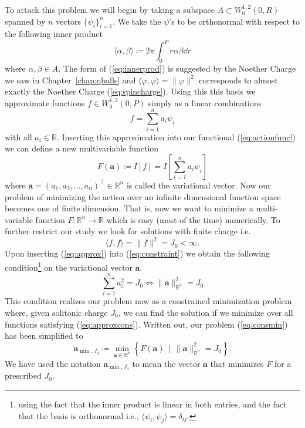 To attack this problem we will begin by taking a subspace
\(A\subset W^{1,2}_0(0,R)\) spanned by \(n\) vectors \(\{\psi_i\}_{i = 1}^n\).
We take the \(\psi\)'s to be orthonormal with respect to the following inner
product
\begin{equation}\label{eq:innerprod}
    \langle\alpha,\beta\rangle\coloneqq 2\pi\int_0^P r\alpha\beta\dd{r}
\end{equation}
where \(\alpha,\beta\in A\).
The form of (\ref{eq:innerprod}) is suggested by the Noether Charge we saw in
Chapter~\ref{chap:qballs} and \(\langle\varphi,\varphi\rangle = \|\varphi\|^2\)
corresponds to almost exactly the Noether Charge (\ref{eq:spincharge}). Using
this this basis we approximate functions \(f \in W_0^{1,2}(0, P)\) simply as a
linear combinations
\begin{equation}\label{eq:approx}
    f = \sum_{i = 1}^n a_i\psi_i
\end{equation}
with all \(a_i\in \mathbb{R}\). Inserting this approximation into our functional
(\ref{eq:actionfunc}) we can define a new multivariable function
\begin{equation}\label{eq:objfun}
    F(\mathbf{a}) \coloneqq I[f] = I\!\left[\sum_{i = 1}^n a_i\psi_i\right]
\end{equation}
where \(\mathbf{a} = (a_1, a_2,\ldots, a_n)^\intercal\in \mathbb{R}^n\) is
called the variational vector. Now our problem of minimizing the action over an
infinite dimensional function space becomes one of finite dimension. That is,
now we want to minimize a multi-variable function \(F:\mathbb{R}^n\to\mathbb{R}\)
which is easy (most of the time) numerically. To further restrict our study we
look for solutions with finite charge i.e.
\begin{equation}\label{eq:constraint}
    \langle f, f \rangle = \|f\|^2 = J_0 < \infty.
\end{equation}
Upon inserting (\ref{eq:approx}) into (\ref{eq:constraint}) we obtain the
following condition\footnote{using the fact that the inner product is linear in
    both entries, and the fact that the basis is orthonormal i.e.,
    \(\langle \psi_i,\psi_j\rangle = \delta_{ij}\).} on the variational vector
\(\mathbf{a}\).
\begin{equation}\label{eq:approxcons}
    \sum_{i = 1}^n a_i^2 = J_0 \iff \|\mathbf{a}\|^2_{\mathbb{R}^n} = J_0
\end{equation}
This condition realizes our problem now as a constrained minimization problem
where, given solitonic charge \(J_0\), we can find the solution if we minimize
over all functions satisfying (\ref{eq:approxcons}). Written out, our problem
(\ref{eq:consmin}) has been simplified to
\begin{equation}\label{eq:problem}
    \mathbf{a}_{\min, J_0}\coloneqq \min_{\mathbf{a}\in\mathbb{R}^n}\left\{F(\mathbf{a}) \,\mid\, \|\mathbf{a}\|^2_{\mathbb{R}^n} = J_0\right\}.
\end{equation}
We have used the notation \(\mathbf{a}_{\min, J_0}\) to mean the vector
\(\mathbf{a}\) that minimizes \(F\) for a prescribed \(J_0\).

